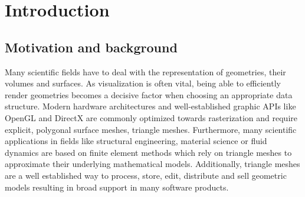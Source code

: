 \chapter{Introduction}
\label{ch:introduction}

\section{Motivation and background}
\label{sec:motivation}

Many scientific fields have to deal with the representation of geometries, their volumes and surfaces.
As visualization is often vital, being able to efficiently render geometries becomes a decisive factor when choosing an appropriate data structure.
Modern hardware architectures and well-established graphic APIs like OpenGL and DirectX are commonly optimized towards rasterization and require explicit, polygonal surface meshes, \eg triangle meshes.
Furthermore, many scientific applications in fields like structural engineering, material science or fluid dynamics are based on finite element methods which rely on triangle meshes to approximate their underlying mathematical models.
Additionally, triangle meshes are a well established way to process, store, edit, distribute and sell geometric models resulting in broad support in many software products.


